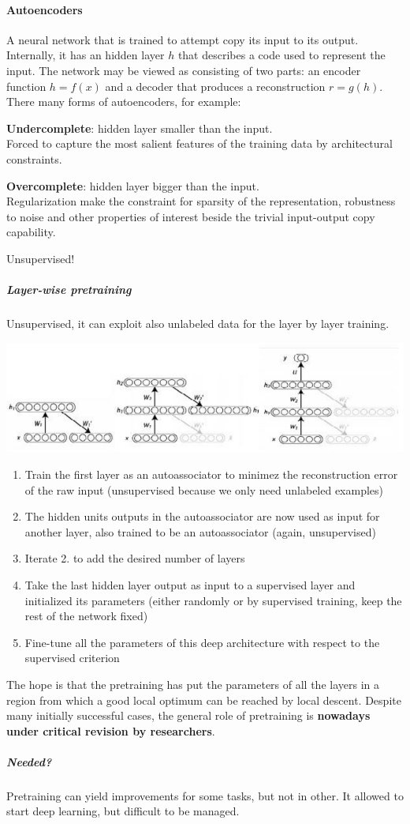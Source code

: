 \documentclass[10pt]{report}
\begin{document}
\paragraph{Autoencoders} A neural network that is trained to attempt copy its input to its output. Internally, it has an hidden layer $h$ that describes a code used to represent the input. The network may be viewed as consisting of two parts: an encoder function $h = f(x)$ and a decoder that produces a reconstruction $r = g(h)$.\\
There many forms of autoencoders, for example:
\begin{list}{}{}
	\item \textbf{Undercomplete}: hidden layer smaller than the input.\\
	Forced to capture the most salient features of the training data by architectural constraints.
	\item \textbf{Overcomplete}: hidden layer bigger than the input.\\
	Regularization make the constraint for sparsity of the representation, robustness to noise and other properties of interest beside the trivial input-output copy capability.
\end{list}
Unsupervised!
\subparagraph{Layer-wise pretraining} Unsupervised, it can exploit also unlabeled data for the layer by layer training.
\begin{center}
	\includegraphics[scale=0.5]{30.png}
\end{center}
\begin{enumerate}
	\item Train the first layer as an autoassociator to minimez the reconstruction error of the raw input (unsupervised because we only need unlabeled examples)
	\item The hidden units outputs in the autoassociator are now used as input for another layer, also trained to be an autoassociator (again, unsupervised)
	\item Iterate 2. to add the desired number of layers
	\item Take the last hidden layer output as input to a supervised layer and initialized its parameters (either randomly or by supervised training, keep the rest of the network fixed)
	\item Fine-tune all the parameters of this deep architecture with respect to the supervised criterion
\end{enumerate}
The hope is that the pretraining has put the parameters of all the layers in a region from which a good local optimum can be reached by local descent. Despite many initially successful cases, the general role of pretraining is \textbf{nowadays under critical revision by researchers}.
\subparagraph{Needed?} Pretraining can yield improvements for some tasks, but not in other. It allowed to start deep learning, but difficult to be managed.
\end{document}
